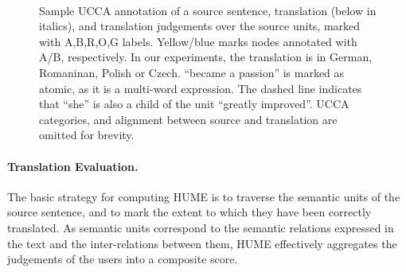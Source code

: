 \documentclass[11pt]{article}
\newcommand{\com}[1]{}
\begin{document}
\begin{figure}
\begin{adjustbox}{trim=2.3cm 0 0 0}
  \\
  \end{adjustbox}

  \caption{\label{fig:ucca_example2}
    Sample UCCA annotation of a source sentence, translation (below in italics), 
    and translation judgements over the source units, marked with A,B,R,O,G labels. Yellow/blue marks
    nodes annotated with A/B, respectively.
    In our experiments, the translation is in German, Romaninan, Polish or Czech.
    ``became a passion'' is marked as atomic, as it is a multi-word expression.
    The dashed line indicates that ``she'' is also a child of the unit ``greatly improved''.
    UCCA categories, and alignment between source and translation are omitted for brevity.}
  
\end{figure}


\paragraph{Translation Evaluation.}
The basic strategy for computing HUME is to traverse
the semantic units of the source sentence, and to mark the extent to which
they have been correctly translated. As semantic units correspond to the
semantic relations expressed in the text and the inter-relations between them,
HUME effectively aggregates the judgements of the users into a composite score.
\end{document}
